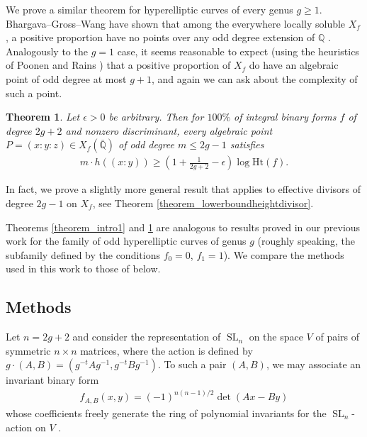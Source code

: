 \documentclass{article} %
\newtheorem{theorem}[proposition]{Theorem}
\numberwithin{equation}{section}
\DeclareMathOperator{\SL}{SL}
\newcommand{\Q}{\mathbb{Q}}
\newcommand{\height}{\mathrm{Ht}}
\begin{document}
We prove a similar theorem for hyperelliptic curves of every genus $g\geq 1$.
Bhargava--Gross--Wang have shown that among the everywhere locally soluble $X_f$, a positive proportion have no points over any odd degree extension of $\Q$ \cite{BGW17}.
Analogously to the $g=1$ case, it seems reasonable to expect (using the heuristics of Poonen and Rains \cite{PoonenRainsRandom}) that a positive proportion of $X_f$ do have an algebraic point of odd degree at most $g+1$, and again we can ask about the complexity of such a point.


\begin{theorem}\label{theorem_intro2}
    Let $\epsilon >0$ be arbitrary.
    Then for $100\%$ of integral binary forms $f$ of degree $2g+2$ and nonzero discriminant, every algebraic point $P  = (x:y:z) \in X_f(\bar{\Q})$ of odd degree $m\leq 2g-1$ satisfies
    \begin{align}
        m\cdot  h((x:y)) \geq \left( 1+ \frac{1}{2g+2} - \epsilon \right) \log \height(f).
    \end{align}
\end{theorem}
In fact, we prove a slightly more general result that applies to effective divisors of degree $2g-1$ on $X_f$, see Theorem \ref{theorem_lowerboundheightdivisor}. 

Theorems \ref{theorem_intro1} and \ref{theorem_intro2} are analogous to results proved in our previous work \cite{lagathorne2024smallheightoddhyperelliptic} for the family of odd hyperelliptic curves of genus $g$ (roughly speaking, the subfamily defined by the conditions $f_0 = 0$, $f_1 = 1$). We compare the methods used in this work to those of \cite{lagathorne2024smallheightoddhyperelliptic} below. 


\subsection{Methods}
Let $n=2g+2$ and consider the representation of $\SL_n$ on the space $V$ of pairs of symmetric $n\times n$ matrices, where the action is defined by $g\cdot (A,B) = (g^{-t}Ag^{-1},g^{-t}Bg^{-1})$.
To such a pair $(A,B)$, we may associate an invariant binary form 
\begin{align*}
    f_{A,B}(x,y) = (-1)^{n(n-1)/2}\det(Ax -By)
\end{align*}
whose coefficients freely generate the ring of polynomial invariants for the $\SL_n$-action on $V$ \cite{BGW17}.
\end{document}
